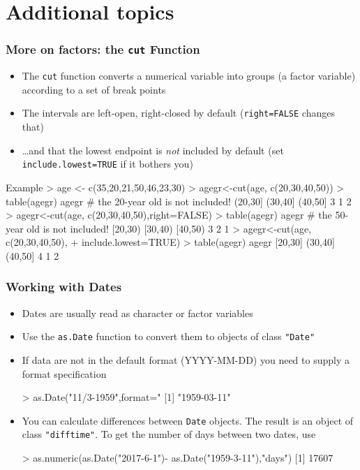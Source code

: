 \documentclass{beamer}
\newcommand{\code}[1]{\texttt{#1}}
\let\overbatim\verbatim
\let\endoverbatim\endverbatim
\newenvironment{vcode}%
{\bgroup\baselineskip=0.8\baselineskip\overbatim}%
{\endoverbatim\egroup}
\begin{document}
\section{Additional topics}
\begin{frame}
  \frametitle{More on factors: the \code{cut} Function}
  \begin{itemize}
  \item The \code{cut} function converts a numerical variable into groups
  (a factor variable)  according to a set of break points
  \item The intervals are left-open, right-closed by
    default (\code{right=FALSE} changes that)
  \item \dots and that the lowest endpoint is \emph{not} included by
    default (set \code{include.lowest=TRUE} if it bothers you)
  \end{itemize}
\end{frame}

\begin{frame}[fragile]
Example
\begin{vcode}
> age <- c(35,20,21,50,46,23,30)
> agegr<-cut(age, c(20,30,40,50))
> table(agegr)  
agegr      # the 20-year old is not included!
(20,30] (30,40] (40,50] 
      3       1       2 
> agegr<-cut(age, c(20,30,40,50),right=FALSE)
> table(agegr)
agegr    # the 50-year old is not included!
[20,30) [30,40) [40,50) 
      3       2       1 
> agegr<-cut(age, c(20,30,40,50),
+                           include.lowest=TRUE)
> table(agegr)
agegr
[20,30] (30,40] (40,50] 
4       1       2 \end{vcode}
\end{frame}

\begin{frame}[fragile]
  \frametitle{Working with Dates}
  \begin{itemize}
  \item Dates are usually read as character or factor variables
    \pause
  \item Use the \code{as.Date} function to convert them to objects of
    class \code{"Date"}
    \pause
  \item If data are not in the default format (YYYY-MM-DD) you need to
    supply a format specification

    \begin{vcode}
> as.Date("11/3-1959",format="%
[1] "1959-03-11"
    \end{vcode}
    \pause
  \item You can calculate differences between \code{Date} objects. The
    result is an object of class  \code{"difftime"}. To get the number
    of days between two dates, use

    \begin{vcode}
> as.numeric(as.Date("2017-6-1")-
             as.Date("1959-3-11"),"days")
[1] 17607
    \end{vcode}
  \end{itemize}
\end{frame}
\end{document}
